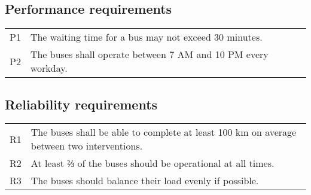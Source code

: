 \documentclass[a4paper]{article}
\begin{document}

\subsection{Performance requirements}
\begin{tabularx}{\textwidth}{p{.75cm} X}
        P1 & The waiting time for a bus may not exceed 30 minutes. \\
        P2 & The buses shall operate between 7 AM and 10 PM every workday. \\
\end{tabularx}


\subsection{Reliability requirements}
\begin{tabularx}{\textwidth}{p{.75cm} X}
	R1 & The buses shall be able to complete at least 100 km on average
	     between two interventions. \\
	R2 & At least ⅔ of the buses should be operational at all times. \\
        R3 & The buses should balance their load evenly if possible. \\
\end{tabularx}

\end{document}
